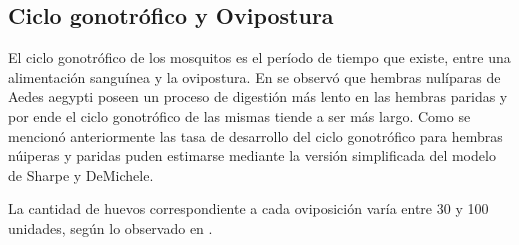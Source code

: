 \subsection{Ciclo gonotrófico y Ovipostura}
El ciclo gonotrófico de los mosquitos es el período de tiempo que existe, entre una alimentación
sanguínea y la ovipostura. En \cite{edman1987host} se observó que hembras nulíparas de Aedes
aegypti poseen un proceso de digestión más lento en las hembras paridas y por ende el ciclo
gonotrófico de las mismas tiende a ser más largo. Como se mencionó anteriormente las tasa de
desarrollo del ciclo gonotrófico para hembras núiperas y paridas puden estimarse mediante la
versión simplificada del modelo de Sharpe y DeMichele.

La cantidad de huevos correspondiente a cada oviposición varía entre 30 y 100 unidades, según lo
observado en \cite{luevano1993ciclo, beltran2001bionomia, cabezas2005dengue}.
